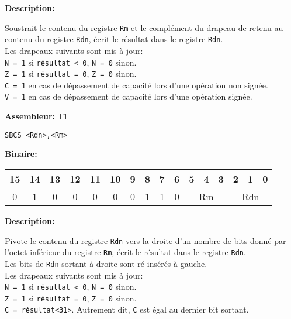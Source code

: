 \documentclass{article}
\begin{document}
    \label{subsubsubsec:SBC}

    \textbf{Description: }

    Soustrait le contenu du registre \texttt{Rm} et le complément du drapeau de retenu au contenu du registre \texttt{Rdn}, écrit le résultat dans le registre \texttt{Rdn}.\\
    Les drapeaux suivants sont mis à jour:\\
    \texttt{N = 1} si \texttt{résultat < 0}, \texttt{N = 0} sinon.\\
    \texttt{Z = 1} si \texttt{résultat = 0}, \texttt{Z = 0} sinon.\\
    \texttt{C = 1} en cas de dépassement de capacité lors d'une opération non signée.\\
    \texttt{V = 1} en cas de dépassement de capacité lors d'une opération signée.

    \textbf{Assembleur:} T1

    \begin{lstlisting}
SBCS <Rdn>,<Rm>
    \end{lstlisting}

    \textbf{Binaire:}

    \begin{tabular}{| c c c c c c c c c c c c c c c c |}
        \hline
        15 & 14 & 13 & 12 & 11 & 10 & \multicolumn{1}{|c}{9} & 8 & 7 & 6 & \multicolumn{1}{|c}{5} & 4 & 3 & \multicolumn{1}{|c}{2} & 1 & 0 \\
        \hline
        0 & 1 & 0 & 0 & 0 & 0 & \multicolumn{1}{|c}{0} & 1 & 1 & 0 & \multicolumn{3}{|c}{Rm} & \multicolumn{3}{|c|}{Rdn} \\
        \hline
    \end{tabular}




    \textbf{Description: }

    Pivote le contenu du registre \texttt{Rdn} vers la droite d'un nombre de bits donné par l'octet inférieur du registre \texttt{Rm}, écrit le résultat dans le registre \texttt{Rdn}.\\
    Les bits de \texttt{Rdn} sortant à droite sont ré-insérés à gauche.\\
    Les drapeaux suivants sont mis à jour:\\
    \texttt{N = 1} si \texttt{résultat < 0}, \texttt{N = 0} sinon.\\
    \texttt{Z = 1} si \texttt{résultat = 0}, \texttt{Z = 0} sinon.\\
    \texttt{C = résultat<31>}.
    Autrement dit, \texttt{C} est égal au dernier bit sortant.
\end{document}
